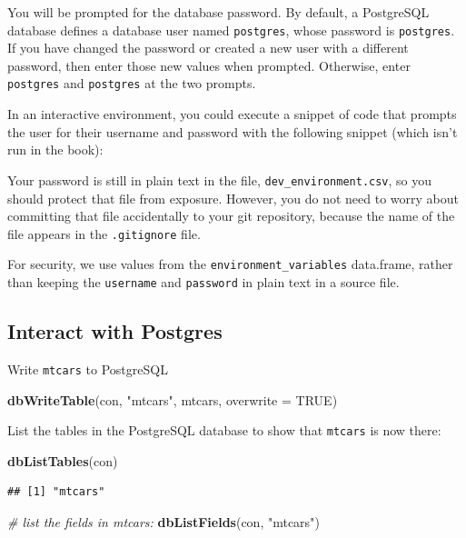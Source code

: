 \documentclass[]{book}
\newenvironment{Shaded}{\begin{snugshade}}{\end{snugshade}}
\newcommand{\CommentTok}[1]{\textcolor[rgb]{0.56,0.35,0.01}{\textit{#1}}}
\newcommand{\DataTypeTok}[1]{\textcolor[rgb]{0.13,0.29,0.53}{#1}}
\newcommand{\KeywordTok}[1]{\textcolor[rgb]{0.13,0.29,0.53}{\textbf{#1}}}
\newcommand{\NormalTok}[1]{#1}
\newcommand{\OtherTok}[1]{\textcolor[rgb]{0.56,0.35,0.01}{#1}}
\newcommand{\StringTok}[1]{\textcolor[rgb]{0.31,0.60,0.02}{#1}}
\theoremstyle{definition}
\theoremstyle{definition}
\theoremstyle{definition}
\theoremstyle{remark}
\begin{document}
You will be prompted for the database password. By default, a PostgreSQL
database defines a database user named \texttt{postgres}, whose password
is \texttt{postgres}. If you have changed the password or created a new
user with a different password, then enter those new values when
prompted. Otherwise, enter \texttt{postgres} and \texttt{postgres} at
the two prompts.

In an interactive environment, you could execute a snippet of code that
prompts the user for their username and password with the following
snippet (which isn't run in the book):

Your password is still in plain text in the file,
\texttt{dev\_environment.csv}, so you should protect that file from
exposure. However, you do not need to worry about committing that file
accidentally to your git repository, because the name of the file
appears in the \texttt{.gitignore} file.

For security, we use values from the \texttt{environment\_variables}
data.frame, rather than keeping the \texttt{username} and
\texttt{password} in plain text in a source file.

\hypertarget{interact-with-postgres}{%
\subsection{Interact with Postgres}\label{interact-with-postgres}}

Write \texttt{mtcars} to PostgreSQL

\begin{Shaded}
\begin{Highlighting}[]
\KeywordTok{dbWriteTable}\NormalTok{(con, }\StringTok{"mtcars"}\NormalTok{, mtcars, }\DataTypeTok{overwrite =} \OtherTok{TRUE}\NormalTok{)}
\end{Highlighting}
\end{Shaded}

List the tables in the PostgreSQL database to show that \texttt{mtcars}
is now there:

\begin{Shaded}
\begin{Highlighting}[]
\KeywordTok{dbListTables}\NormalTok{(con)}
\end{Highlighting}
\end{Shaded}

\begin{verbatim}
## [1] "mtcars"
\end{verbatim}

\begin{Shaded}
\begin{Highlighting}[]
\CommentTok{# list the fields in mtcars:}
\KeywordTok{dbListFields}\NormalTok{(con, }\StringTok{"mtcars"}\NormalTok{)}
\end{Highlighting}
\end{Shaded}
\end{document}
